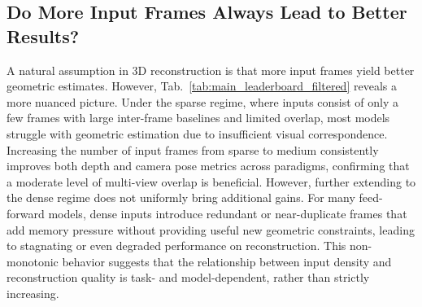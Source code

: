 \documentclass{llmxive}
\begin{document}
\subsection{Do More Input Frames Always Lead to Better Results?}
A natural assumption in 3D reconstruction is that more input frames yield better geometric estimates. 
%
However, Tab.~\ref{tab:main_leaderboard_filtered} reveals a more nuanced picture.
%
Under the sparse regime, where inputs consist of only a few frames with large inter-frame baselines and limited overlap, most models struggle with geometric estimation due to insufficient visual correspondence.
%
Increasing the number of input frames from sparse to medium consistently improves both depth and camera pose metrics across paradigms, confirming that a moderate level of multi-view overlap is beneficial.
%
However, further extending to the dense regime does not uniformly bring additional gains. 
%
For many feed-forward models, dense inputs introduce redundant or near-duplicate frames that add memory pressure without providing useful new geometric constraints, leading to stagnating or even degraded performance on reconstruction.
%
This non-monotonic behavior suggests that the relationship between input density and reconstruction quality is task- and model-dependent, rather than strictly increasing.
%
\end{document}

